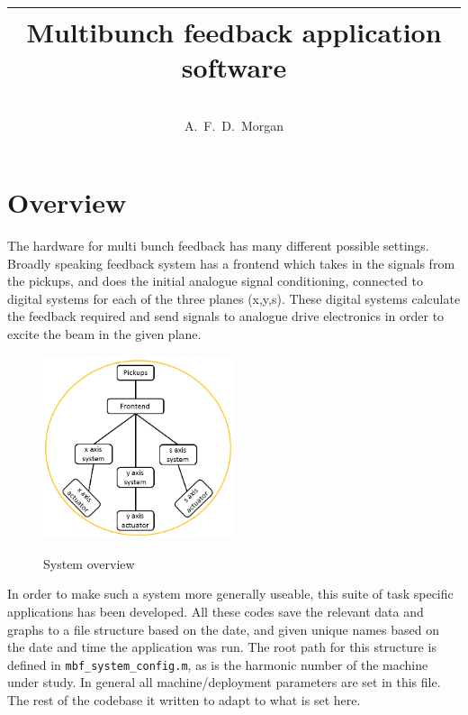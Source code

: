 \documentclass{report}
\newcommand{\docTitle}{Multibunch feedback application software}
\newcommand{\docAuthor}{A.~F.~D.~Morgan}
\begin{document}
\title{
\begin{tabular}{|c|}
\hline
\hline
\large{\bf{\docTitle}}\\
\hline
\end{tabular}}
\author{\docAuthor}
\maketitle
\tableofcontents

\chapter{Overview}
The hardware for multi bunch feedback has many different possible settings.  Broadly speaking feedback system has a frontend which takes in the signals from the pickups, and does the initial analogue signal conditioning, connected to digital systems for each of the three planes (x,y,s). These digital systems calculate the feedback required and send signals to analogue drive electronics in order to excite the beam in the given plane.

\begin{figure}[hbt]
\begin{center}
  \includegraphics[width=0.5\textwidth]{top_level_system_overview.png}\\
  \caption{System overview}\label{system_overview}
\end{center}
\end{figure}

In order to make such a system more generally useable, this suite of task specific applications has been developed. All these codes save the relevant data and graphs to a file structure based on the date, and given unique names based on the date and time the application was run. The root path for this structure is defined in \verb|mbf_system_config.m|, as is the harmonic number of the machine under study. In general all machine/deployment parameters are set in this file. The rest of the codebase it written to adapt to what is set here.
\end{document}
